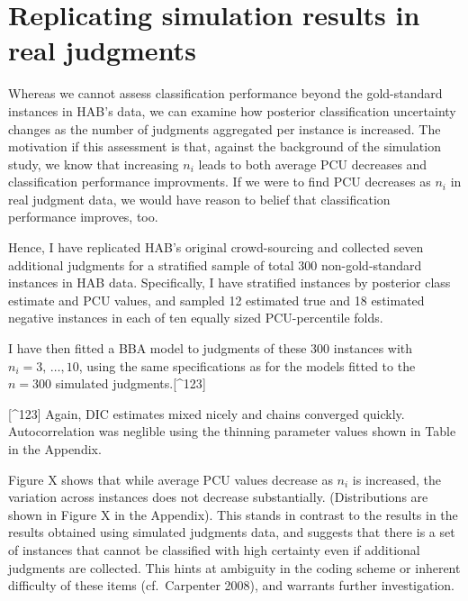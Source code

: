 \documentclass[12pt,]{article}
\begin{document}
\hypertarget{replicating-simulation-results-in-real-judgments}{%
\section{Replicating simulation results in real
judgments}\label{replicating-simulation-results-in-real-judgments}}

Whereas we cannot assess classification performance beyond the
gold-standard instances in HAB's data, we can examine how posterior
classification uncertainty changes as the number of judgments aggregated
per instance is increased. The motivation if this assessment is that,
against the background of the simulation study, we know that increasing
\(n_i\) leads to both average PCU decreases and classification
performance improvments. If we were to find PCU decreases as \(n_i\) in
real judgment data, we would have reason to belief that classification
performance improves, too.

Hence, I have replicated HAB's original crowd-sourcing and collected
seven additional judgments for a stratified sample of total 300
non-gold-standard instances in HAB data. Specifically, I have stratified
instances by posterior class estimate and PCU values, and sampled 12
estimated true and 18 estimated negative instances in each of ten
equally sized PCU-percentile folds.

I have then fitted a BBA model to judgments of these 300 instances with
\(n_i = 3,\,\ldots, 10\), using the same specifications as for the
models fitted to the \(n = 300\) simulated judgments.{[}\^{}123{]}

{[}\^{}123{]} Again, DIC estimates mixed nicely and chains converged
quickly. Autocorrelation was neglible using the thinning parameter
values shown in Table in the Appendix.

Figure X shows that while average PCU values decrease as \(n_i\) is
increased, the variation across instances does not decrease
substantially. (Distributions are shown in Figure X in the Appendix).
This stands in contrast to the results in the results obtained using
simulated judgments data, and suggests that there is a set of instances
that cannot be classified with high certainty even if additional
judgments are collected. This hints at ambiguity in the coding scheme or
inherent difficulty of these items (cf.~Carpenter 2008), and warrants
further investigation.
\end{document}
